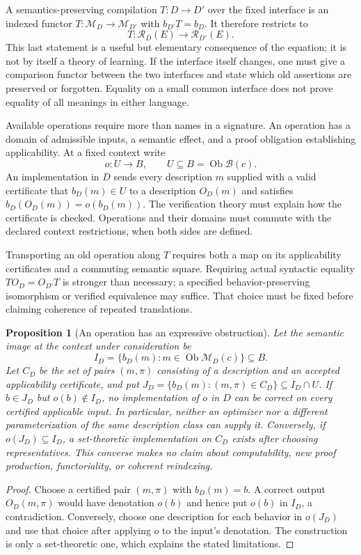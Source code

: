 \documentclass[11pt]{article}
\newtheorem{proposition}[theorem]{Proposition}
\theoremstyle{definition}
\begin{document}
A semantics-preserving compilation $T:D\to D'$ over the fixed interface is an
indexed functor $T:\mathcal M_D\to\mathcal M_{D'}$ with
$b_{D'}T=b_D$. It therefore restricts to
\[
 T:\mathcal R_D(E)\longrightarrow\mathcal R_{D'}(E).
\]
This last statement is a useful but elementary consequence of the equation;
it is not by itself a theory of learning. If the interface itself changes,
one must give a comparison functor between the two interfaces and state
which old assertions are preserved or forgotten. Equality on a small common
interface does not prove equality of all meanings in either language.

Available operations require more than names in a signature. An operation
has a domain of admissible inputs, a semantic effect, and a proof obligation
establishing applicability. At a fixed context write
\[
  o:U\longrightarrow B,\qquad U\subseteq B=\operatorname{Ob}\mathcal B(c).
\]
An implementation in $D$ sends every description $m$ supplied with a valid
certificate that $b_D(m)\in U$ to a description $O_D(m)$ and satisfies
$b_D(O_D(m))=o(b_D(m))$. The verification theory must explain how the
certificate is checked. Operations and their domains must commute with the
declared context restrictions, when both sides are defined.

Transporting an old operation along $T$ requires both a map on its
applicability certificates and a commuting semantic square. Requiring actual
syntactic equality $TO_D=O_{D'}T$ is stronger than necessary; a specified
behavior-preserving isomorphism or verified equivalence may suffice. That
choice must be fixed before claiming coherence of repeated translations.

\begin{proposition}[An operation has an expressive obstruction]
\label{prop:cc-operation-obstruction}
Let the semantic image at the context under consideration be
\[
 I_D=\{b_D(m):m\in\operatorname{Ob}\mathcal M_D(c)\}\subseteq B.
\]
Let $C_D$ be the set of pairs $(m,\pi)$ consisting of a description and an
accepted applicability certificate, and put
$J_D=\{b_D(m):(m,\pi)\in C_D\}\subseteq I_D\cap U$.
If $b\in J_D$ but $o(b)\notin I_D$, no implementation of $o$ in $D$
can be correct on every certified applicable input. In particular, neither
an optimizer nor a different parameterization of the same description class
can supply it. Conversely, if $o(J_D)\subseteq I_D$, a set-theoretic
implementation on $C_D$ exists after choosing representatives. This converse
makes no claim about computability, new proof production, functoriality, or
coherent reindexing.
\end{proposition}
\begin{proof}
Choose a certified pair $(m,\pi)$ with $b_D(m)=b$.
A correct output $O_D(m,\pi)$ would have denotation
$o(b)$ and hence put $o(b)$ in $I_D$, a contradiction. Conversely, choose
one description for each behavior in $o(J_D)$ and use that choice
after applying $o$ to the input's denotation. The construction is only a
set-theoretic one, which explains the stated limitations.
\end{proof}
\end{document}
